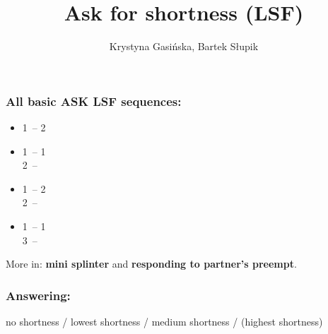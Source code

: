 \documentclass[12pt, a4paper]{article}
\title{Ask for shortness (LSF)}
\author{Krystyna Gasińska, Bartek Słupik}
\begin{document}
\maketitle


\subsubsection*{All basic ASK LSF sequences:}
\begin{itemize}
    \item 1\majs\ -- 2\majs\ \\ 
    \item 1\minor\ -- 1\majs\ \\ 2\majs\ -- 
    \item 1\majs\ -- 2 \\ 2\majs\ -- 
    \item 1\minor\ -- 1\majs \\ 3\majs\ -- 
\end{itemize}

More in: \textbf{mini splinter} and \textbf{responding to partner's preempt}.

\subsubsection*{Answering:}

no shortness / lowest shortness / medium shortness / (highest shortness)

\end{document}
